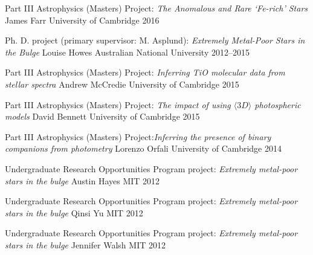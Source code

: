 
\begin{cventries}

  \cventry
    {Part III Astrophysics (Masters) Project: \textit{The Anomalous and Rare `Fe-rich' Stars}} 
    {James Farr}
    {University of Cambridge}
    {2016}
    {}

  \cventry
    {Ph. D. project (primary supervisor: M. Asplund): \textit{Extremely Metal-Poor Stars in the Bulge}} 
    {Louise Howes}
    {Australian National University}
    {2012--2015}
    {}

  \cventry
    {Part III Astrophysics (Masters) Project: \textit{Inferring TiO molecular data from stellar spectra}} 
    {Andrew McCredie}
    {University of Cambridge}
    {2015}
    {}

  \cventry
    {Part III Astrophysics (Masters) Project: \textit{The impact of using $\langle3D\rangle$ photospheric models}} 
    {David Bennett}
    {University of Cambridge}
    {2015}
    {}
    
  \cventry
    {Part III Astrophysics (Masters) Project:\textit{Inferring the presence of binary companions from photometry}} 
    {Lorenzo Orfali}
    {University of Cambridge}
    {2014}
    {}
   
  \cventry
    {Undergraduate Research Opportunities Program project: \textit{Extremely metal-poor stars in the bulge}} 
    {Austin Hayes}
    {MIT}
    {2012}
    {}
  
  \cventry
    {Undergraduate Research Opportunities Program project: \textit{Extremely metal-poor stars in the bulge}} 
    {Qinsi Yu}
    {MIT}
    {2012}
    {}

  \cventry
    {Undergraduate Research Opportunities Program project: \textit{Extremely metal-poor stars in the bulge}} 
    {Jennifer Walsh}
    {MIT}
    {2012}
    {}
      
\end{cventries}
